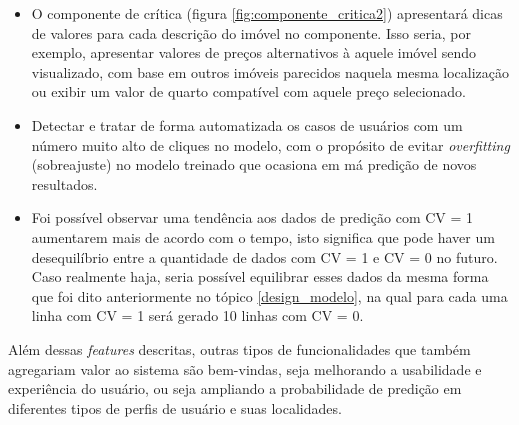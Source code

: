 \begin{itemize}
  \item O componente de crítica (figura \ref{fig:componente_critica2}) apresentará dicas de valores para cada descrição do imóvel no componente. Isso seria, por exemplo, apresentar valores de preços alternativos à aquele imóvel sendo visualizado, com base em outros imóveis parecidos naquela mesma localização ou exibir um valor de quarto compatível com aquele preço selecionado.

  \item Detectar e tratar de forma automatizada os casos de usuários com um número muito alto de cliques no modelo, com o propósito de evitar \textit{overfitting} (sobreajuste) no modelo treinado que ocasiona em má predição de novos resultados.
  
  \item Foi possível observar uma tendência aos dados de predição com CV = 1 aumentarem mais de acordo com o tempo, isto significa que pode haver um desequilíbrio entre a quantidade de dados com CV = 1 e CV = 0 no futuro. Caso realmente haja, seria possível equilibrar esses dados da mesma forma que foi dito anteriormente no tópico \ref{design_modelo}, na qual para cada uma linha com CV = 1 será gerado 10 linhas com CV = 0.
\end{itemize}

Além dessas \textit{features} descritas, outras tipos de funcionalidades que também agregariam valor ao sistema são bem-vindas, seja melhorando a usabilidade e experiência do usuário, ou seja ampliando a probabilidade de predição em diferentes tipos de perfis de usuário e suas localidades.



